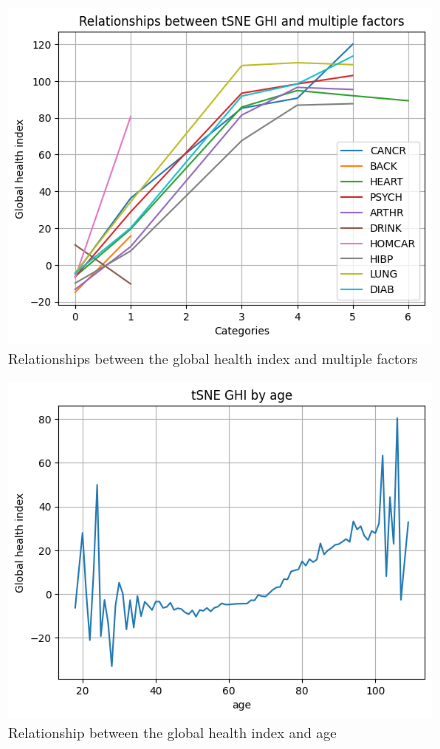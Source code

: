 \documentclass[]{article}
\begin{document}
\begin{figure}[!h]
\centering
\includegraphics[scale=0.75]{relationships_between_tSNE_GHI_and_multiple_factors.png}
\caption{Relationships between the global health index and multiple factors}
\label{relationships_between_tSNE_GHI_and_multiple_factors}
\end{figure}
\begin{figure}[!h]
\centering
\includegraphics[scale=0.75]{tSNE_GHI_by_age.png}
\caption{Relationship between the global health index and age}
\label{tSNE_GHI_by_age}
\end{figure}
\end{document}
